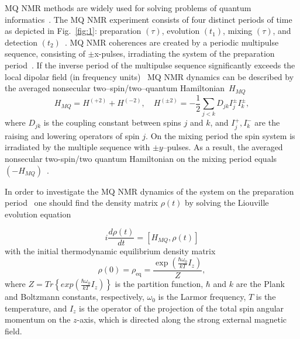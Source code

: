 \documentclass[preprint,12pt]{elsarticle}
\begin{document}
MQ NMR methods are widely used for solving problems of quantum informatics~\cite{17,18}.
The MQ NMR experiment consists of four distinct periods of time as depicted in Fig.~\ref{fig:1}:
preparation $(\tau)$, evolution $(t_1)$, mixing $(\tau)$, and detection $(t_2)$~\cite{10}.
MQ NMR coherences are created by a periodic multipulse sequence, consisting of
$\pm$x-pulses, irradiating the system of the preparation period~\cite{10}.
If the inverse period of the multipulse sequence significantly exceeds the local dipolar field (in frequency units)~\cite{19}
MQ NMR dynamics can be described by the averaged nonsecular two--spin/two--quantum Hamiltonian~$H_{MQ}$~\cite{20}
%
\begin{equation} \label{eq:1}
        H_{MQ} = H^{(+2)} + H^{(-2)} , \quad
        H^{(\pm 2)} = -\frac{1}{2} \sum_{j<k} D_{jk} I_{j} ^\pm I_k^\pm,
\end{equation}
%
where $D_{jk}$ is the coupling constant between spins $j$ and $k$,
and $I_{j}^+, I_k ^-$ are the raising and lowering operators of spin $j$.
On the mixing period the spin system is irradiated by the multiple sequence with $\pm y$--pulses.
As a result, the averaged nonsecular two-spin/two quantum Hamiltonian on the mixing period equals $(-H_{MQ})$~\cite{10}.


In order to investigate the MQ NMR dynamics of the system on the preparation period~\cite{10} one should find the density matrix $\rho(t)$ by solving the Liouville evolution equation~\cite{19}

\begin{equation}
    \label{eq:2}
        i\frac{d\rho(t)}{dt} = [H_{MQ}, \rho(t)]
\end{equation}
with the initial thermodynamic equilibrium density matrix
\begin{equation}
    \label{eq:3}
        \rho(0) = \rho_\mathrm{eq} = \frac{\exp(\frac{\hbar \omega_0}{kT}I_z)}{Z},
\end{equation}
where $Z=Tr \left\{exp\left(\frac{\hbar \omega_0}{kT}I_z\right) \right\}$ is the partition function,
$\hbar$ and $k$ are the Plank and Boltzmann constants, respectively,
$\omega_0$ is the Larmor frequency,
$T$ is the temperature,
and $I_z$ is the operator of the projection of the total spin angular momentum on the $z$-axis,
which is directed along the strong external magnetic field.
\end{document}
